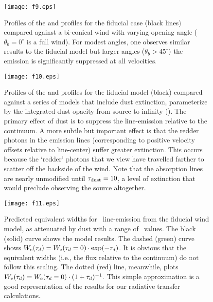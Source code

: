 \documentclass[12pt,preprint]{aastex}
\begin{document}
\begin{figure}
\texttt{[image: f9.eps]}
\caption{
Profiles of the  and  profiles for the fiducial
case (black lines) compared against a bi-conical wind with varying
opening angle ($\theta_b = 0^\circ$ is a full wind).  For modest angles, one
observes similar results to the fiducial model but larger angles
($\theta_b > 45^\circ$) the emission is significantly suppressed at
all velocities.  
}
\label{fig:biconical}
\end{figure}

\begin{figure}
\texttt{[image: f10.eps]}
\caption{
Profiles of the  and  profiles for the fiducial
model (black) compared against a series of models that include 
dust extinction, parameterize by the integrated dust opacity from
source to infinity (\taud).  The primary effect of dust is to suppress 
the line-emission relative to the continuum. 
A more subtle but important effect is that the redder photons in the
emission lines (corresponding to positive velocity offsets relative to
line-center) suffer greater extinction.  
This occurs because the `redder' photons that we view have travelled 
farther to scatter off the backside of the wind.  Note that
the absorption lines are nearly unmodified until $\tau_{\rm dust} = 10$, a
level of extinction that would preclude observing the source
altogether.
}
\label{fig:dust}
\end{figure}

\begin{figure}
\texttt{[image: f11.eps]}
\caption{
Predicted equivalent widths for \mgiib\ line-emission from the
fiducial wind model, as attenuated by dust with a range of \taud\
values.  
The black (solid) curve shows the model results.
The dashed (green) curve shows
$W_{\rm e}(\tau_d) = W_{\rm e}(\tau_d = 0) \cdot \exp(-\tau_d)$.
It is obvious that the equivalent widths (i.e., the flux relative to
the continuum) do not follow this scaling.
The dotted (red) line, meanwhile, plots $W_{\rm e}(\tau_d) = W_{\rm e}(\tau_d = 0)
\cdot (1+\tau_d)^{-1}$. 
This simple approximation is a good
representation of the results for our radiative transfer calculations.   
}
\label{fig:dust_tau}
\end{figure}
\end{document}
